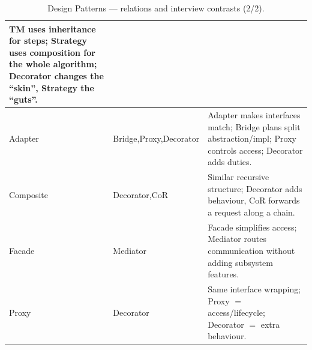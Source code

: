 \begin{table}[H]
\begin{tabularx}{\textwidth}{%
        |>{\raggedright\arraybackslash}p{}%
        |>{\raggedright\arraybackslash}p{}%
        |X|}
        TM uses inheritance for steps; Strategy uses composition for the whole algorithm; Decorator changes the ``skin'', Strategy the ``guts''. \\
        \hline
        Adapter & Bridge,\newline Proxy,\newline Decorator &
        Adapter makes interfaces match; Bridge plans split abstraction/impl; Proxy controls access; Decorator adds duties. \\
        \hline
        Composite & Decorator,\newline CoR &
        Similar recursive structure; Decorator adds behaviour, CoR forwards a request along a chain. \\
        \hline
        Facade & Mediator & Facade simplifies access; Mediator routes communication without adding subsystem features. \\
        \hline
        Proxy & Decorator & Same interface wrapping; Proxy $=$ access/lifecycle; Decorator $=$ extra behaviour. \\
        \hline
    \end{tabularx}
    \caption{Design Patterns --- relations and interview contrasts (2/2).}
    \label{tab:pattern-relations-summary-cont}
\end{table}
